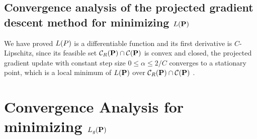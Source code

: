 \subsection{Convergence analysis of the projected gradient descent method for minimizing $L(\mathbf{{P}})$}
We have proved $L(P)$ is a differentiable function and its first derivative is $C$-Lipschitz, since its feasible set $\mathcal{C}_R(\mathbf{{P}}) \cap \mathcal{C}(\mathbf{{P}})$ is convex and closed, the projected gradient update with constant step size $0 \leq \alpha \leq 2/C$ converges to a stationary point, which is a local minimum of $L(\mathbf{{P}})$ over $\mathcal{C}_R(\mathbf{{P}}) \cap \mathcal{C}(\mathbf{{P}})$ \cite{bertsekas1997nonlinear}.


\section{Convergence Analysis for minimizing $L_{\mathit{g}}(\mathbf{{P}})$}
\label{section:convergence_Lg}


